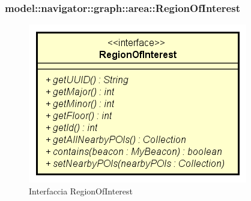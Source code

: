\documentclass[../DefinizioneDiProdotto.tex]{subfiles}
\begin{document}
\subsubsection{model::navigator::graph::area::RegionOfInterest}

    \begin{figure}[H]
        \centering
        \includegraphics{img/RegionOfInterest.png}
        \caption{Interfaccia RegionOfInterest}\label{fig:model::navigator::graph::area::RegionOfInterest} 
    \end{figure}
\end{document}
